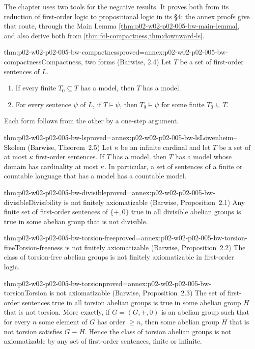 The chapter uses two tools for the negative results.  It proves both from
its reduction of first-order logic to propositional logic in its \S4; the
annex proofs give that route, through the Main Lemma
\cref{thm:p02-w02-p02-005-bw-main-lemma}, and also derive both from
\cref{thm:fol-compactness,thm:downward-ls}.

\begin{hbtheorem}{thm:p02-w02-p02-005-bw-compactness}{proved=annex:p02-w02-p02-005-bw-compactness}{Compactness, two forms (Barwise, 2.4)}
Let \(T\) be a set of first-order sentences of \(L\).
\begin{enumerate}
\item If every finite \(T_0\subseteq T\) has a model, then \(T\) has a model.
\item For every sentence \(\psi\) of \(L\), if \(T\models\psi\), then
      \(T_0\models\psi\) for some finite \(T_0\subseteq T\).
\end{enumerate}
Each form follows from the other by a one-step argument.
\end{hbtheorem}

\begin{hbtheorem}{thm:p02-w02-p02-005-bw-ls}{proved=annex:p02-w02-p02-005-bw-ls}{L\"owenheim--Skolem (Barwise, Theorem~2.5)}
Let \(\kappa\) be an infinite cardinal and let \(T\) be a set of at most
\(\kappa\) first-order sentences.  If \(T\) has a model, then \(T\) has a
model whose domain has cardinality at most \(\kappa\).  In particular, a
set of sentences of a finite or countable language that has a model has a
countable model.
\end{hbtheorem}

\begin{hbtheorem}{thm:p02-w02-p02-005-bw-divisible}{proved=annex:p02-w02-p02-005-bw-divisible}{Divisibility is not finitely axiomatizable (Barwise, Proposition~2.1)}
Any finite set of first-order sentences of \(\{+,0\}\) true in all
divisible abelian groups is true in some abelian group that is not
divisible.
\end{hbtheorem}

\begin{hbtheorem}{thm:p02-w02-p02-005-bw-torsion-free}{proved=annex:p02-w02-p02-005-bw-torsion-free}{Torsion-freeness is not finitely axiomatizable (Barwise, Proposition~2.2)}
The class of torsion-free abelian groups is not finitely axiomatizable in
first-order logic.
\end{hbtheorem}

\begin{hbtheorem}{thm:p02-w02-p02-005-bw-torsion}{proved=annex:p02-w02-p02-005-bw-torsion}{Torsion is not axiomatizable (Barwise, Proposition~2.3)}
The set of first-order sentences true in all torsion abelian groups is true
in some abelian group \(H\) that is not torsion.  More exactly, if
\(G=(G,+,0)\) is an abelian group such that for every \(n\) some element
of \(G\) has order \(\geq n\), then some abelian group \(H\) that is not
torsion satisfies \(G\equiv H\).  Hence the class of torsion abelian groups
is not axiomatizable by any set of first-order sentences, finite or
infinite.
\end{hbtheorem}

